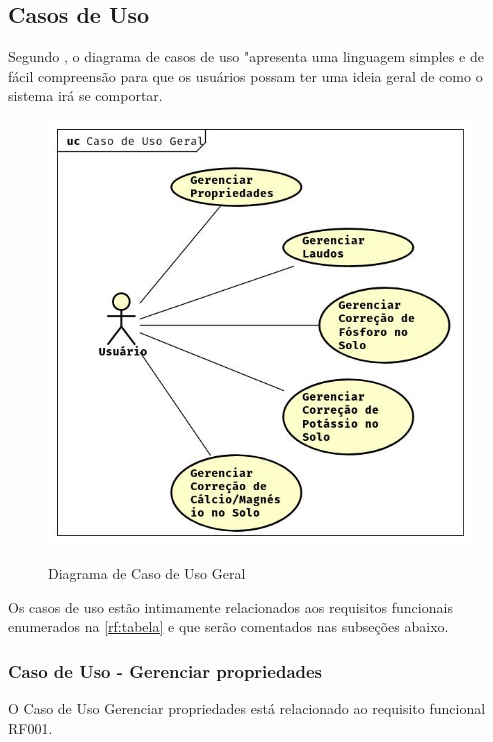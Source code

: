 \subsection{Casos de Uso}
\label{sec:titSecCasoUso}

Segundo , o diagrama de casos de uso "apresenta uma linguagem simples e de fácil compreensão para que os usuários possam ter uma ideia geral de como o sistema irá se comportar.

\begin{figure}[H]
    \centering
    \caption{Diagrama de Caso de Uso Geral}
    \includegraphics[width=13cm]{./dados/analise/casouso.jpg}
    \label{fig:diagramaCasoUso}
\end{figure}

Os casos de uso estão intimamente relacionados aos requisitos funcionais enumerados na \autoref{rf:tabela} e que serão comentados nas subseções abaixo.

\subsubsection{Caso de Uso - Gerenciar propriedades}
\label{sec:titSecCasoUsoPropriedades}

O Caso de Uso Gerenciar propriedades está relacionado ao requisito funcional RF001.


